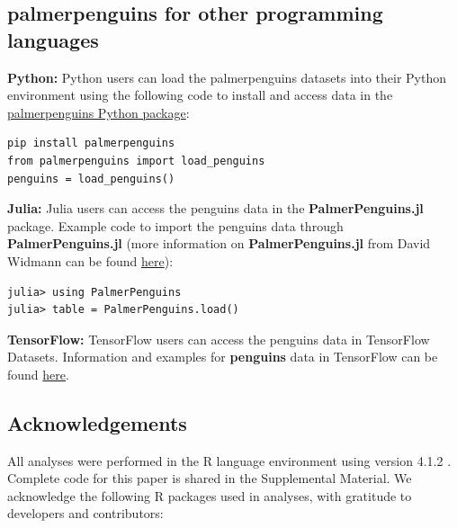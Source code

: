 \hypertarget{palmerpenguins-for-other-programming-languages}{%
\subsection{palmerpenguins for other programming
languages}\label{palmerpenguins-for-other-programming-languages}}

\textbf{Python:} Python users can load the palmerpenguins datasets into
their Python environment using the following code to install and access
data in the
\href{https://pypi.org/project/palmerpenguins/}{palmerpenguins Python
package}:

\begin{verbatim}
pip install palmerpenguins
from palmerpenguins import load_penguins
penguins = load_penguins()
\end{verbatim}

\textbf{Julia:} Julia users can access the penguins data in the
\textbf{PalmerPenguins.jl} package. Example code to import the penguins
data through \textbf{PalmerPenguins.jl} (more information on
\textbf{PalmerPenguins.jl} from David Widmann can be found
\href{https://github.com/devmotion/PalmerPenguins.jl}{here}):

\begin{verbatim}
julia> using PalmerPenguins
julia> table = PalmerPenguins.load()
\end{verbatim}

\textbf{TensorFlow:} TensorFlow users can access the penguins data in
TensorFlow Datasets. Information and examples for \textbf{penguins} data
in TensorFlow can be found
\href{https://www.tensorflow.org/datasets/catalog/penguins}{here}.

\hypertarget{acknowledgements}{%
\subsection{Acknowledgements}\label{acknowledgements}}

All analyses were performed in the R language environment using version
4.1.2 \citep{R-base}. Complete code for this paper is shared in the
Supplemental Material. We acknowledge the following R packages used in
analyses, with gratitude to developers and contributors:

